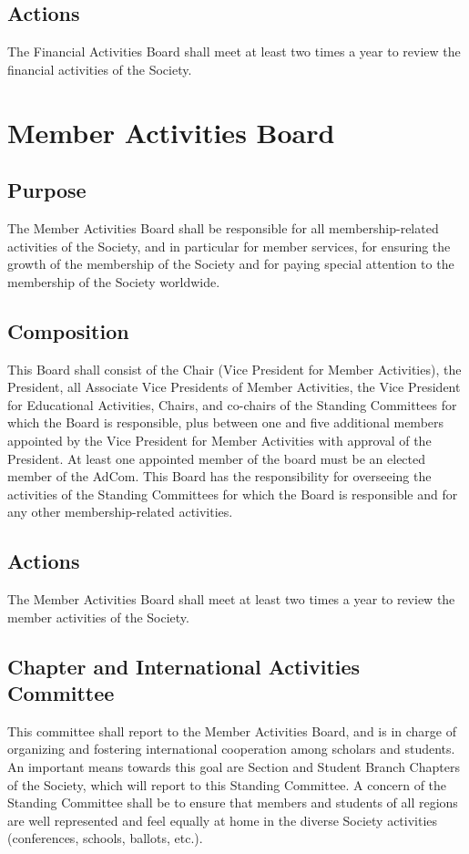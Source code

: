 \documentclass[10pt]{article}
\begin{document}
\subsection{Actions}
The Financial Activities Board shall meet at least two times a year to review the financial activities of the Society. 


\section{Member Activities Board}
\label{MAB}
\subsection{Purpose}
The Member Activities Board shall be responsible for all membership-related activities of the Society, and in particular for member services, for ensuring the growth of the membership of the Society and for paying special attention to the membership of the Society worldwide.

\subsection{Composition}
This Board shall consist of the Chair (Vice President for Member Activities), the President, all Associate Vice Presidents of Member Activities, the Vice President for Educational Activities, Chairs, and co-chairs of the Standing Committees for which the Board is responsible, plus between one and five additional members appointed by the Vice President for Member Activities with approval of the President. At least one appointed member of the board must be an elected member of the AdCom. This Board has the responsibility for overseeing the activities of the Standing Committees for which the Board is responsible and for any other membership-related activities.


\subsection{Actions}
The Member Activities Board shall meet at least two times a year to review the member activities of the Society.


\subsection{Chapter and International Activities Committee}

This committee shall report to the Member Activities Board, and is in charge of organizing and fostering international cooperation among scholars and students. An important means towards this goal are Section and Student Branch Chapters of the Society, which will report to this Standing Committee.  A concern of the Standing Committee shall be to ensure that members and students of all regions are well represented and feel equally at home in the diverse Society activities (conferences, schools, ballots, etc.).
\end{document}
